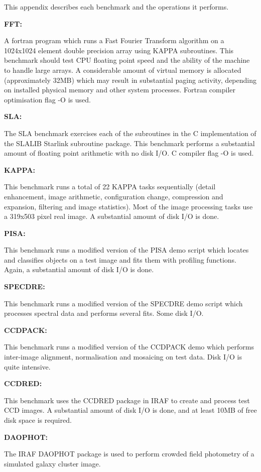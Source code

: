 This appendix describes each benchmark and the operations it performs.

{\bf FFT:}

A fortran program which runs a Fast Fourier Transform algorithm on a
1024x1024 element double precision array using KAPPA subroutines. This
benchmark should test CPU floating point speed and the ability of the
machine to handle large arrays. A considerable amount of virtual memory
is allocated (approximately 32MB) which may result in substantial
paging activity, depending on installed physical memory and other
system processes. Fortran compiler optimisation flag -O is used.

{\bf SLA:}

The SLA benchmark exercises each of the subroutines in the C
implementation of the SLALIB Starlink subroutine package. This
benchmark performs a substantial amount of floating point arithmetic
with no disk I/O. C compiler flag -O is used.

{\bf KAPPA:}

This benchmark runs a total of 22 KAPPA tasks sequentially (detail enhancement,
image arithmetic, configuration change, compression and expansion, filtering 
and image statistics). Most of the image processing tasks use a 319x503 pixel
real image. A substantial amount of disk I/O is done.

{\bf PISA:}

This benchmark runs a modified version of the PISA demo script which locates
and classifies objects on a test image and fits them with profiling functions.
Again, a substantial amount of disk I/O is done.

{\bf SPECDRE:}

This benchmark runs a modified version of the SPECDRE demo script which
processes spectral data and performs several fits. Some disk I/O.

{\bf CCDPACK:}

This benchmark runs a modified version of the CCDPACK demo which performs
inter-image alignment, normalisation and mosaicing on test data. Disk I/O
is quite intensive.

{\bf CCDRED:}

This benchmark uses the CCDRED package in IRAF to create and process
test CCD images. A substantial amount of disk I/O is done, and at least
10MB of free disk space is required.

{\bf DAOPHOT:}

The IRAF DAOPHOT package is used to perform crowded field photometry of
a simulated galaxy cluster image. 

